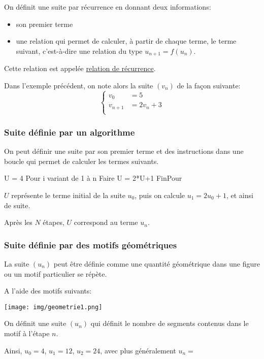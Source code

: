 \documentclass[a4paper]{article}
\begin{document}
		\begin{definition}{}{}
			On définit une suite par récurrence en donnant deux informations:
			\begin{itemize}[label=\textbullet]
				\item son premier terme
				\item une relation qui permet de calculer, à partir de chaque terme, le terme suivant, c'est-à-dire une relation du type $u_{n+1}=f(u_n)$.
			\end{itemize}
			Cette relation est appelée \underline{relation de récurrence}.
		\end{definition}

		\begin{example}{}{}
			Dans l'exemple précédent, on note alors la suite $(v_n)$ de la façon suivante:
			$$\begin{cases}
				v_0 &=5\\
				v_{n+1} &=2v_n+3\\
		\end{cases}$$
		\end{example}

    \pagebreak
    \subsubsection{Suite définie par un algorithme}
    On peut définir une suite par son premier terme et des instructions dans une boucle  qui permet de calculer les termes suivants.

    \begin{example}{}{}
      \begin{PseudoCode}{} 
U = 4
Pour i variant de 1 à n Faire
  U = 2*U+1
FinPour
        \end{PseudoCode}
        $U$ représente le terme initial de la suite $u_0$, puis on calcule $u_1=2u_0+1$, et ainsi de suite.

        Après les $N$ étapes, $U$ correspond au terme $u_n$.
    \end{example}


    \subsubsection{Suite définie par des motifs géométriques}

    La suite $(u_n)$ peut être définie comme une quantité géométrique dans une figure ou un motif particulier se 
    répète.

    \begin{example}{}{}
    A l'aide des motifs suivants:
    \begin{center}
    \texttt{[image: img/geometrie1.png]}
    \end{center}
    On définit une suite $(u_n)$ qui définit le nombre de segments contenus dans le motif à l'étape $n$.

    Ainsi, $u_0=4$, $u_1=12$, $u_2=24$, avec plus généralement $u_n=$
    \end{example}
\end{document}
